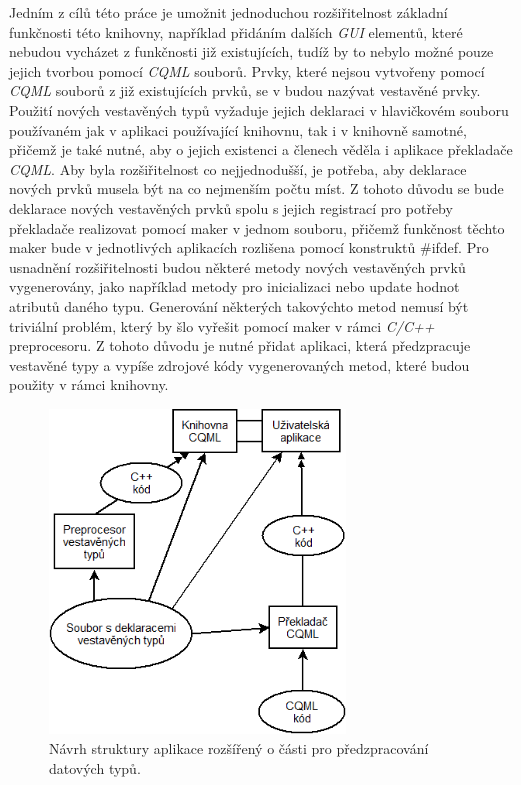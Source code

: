 \documentclass[11pt,twoside,a4paper]{book}
\begin{document}
Jedním z cílů této práce je umožnit jednoduchou rozšiřitelnost základní funkčnosti této knihovny, například přidáním dalších \textit{GUI} elementů, které nebudou vycházet z funkčnosti již existujících, tudíž by to nebylo možné pouze jejich tvorbou pomocí \textit{CQML} souborů. Prvky, které nejsou vytvořeny pomocí \textit{CQML} souborů z již existujících prvků, se v budou nazývat vestavěné prvky.
Použití nových vestavěných typů vyžaduje jejich deklaraci v hlavičkovém souboru používaném jak v aplikaci používající knihovnu, tak i v knihovně samotné, přičemž je také nutné, aby o jejich existenci a členech věděla i aplikace překladače \textit{CQML}. Aby byla rozšiřitelnost co nejjednodušší, je potřeba, aby deklarace nových prvků musela být na co nejmenším počtu míst. Z tohoto důvodu se bude deklarace nových vestavěných prvků spolu s jejich registrací pro potřeby překladače realizovat pomocí maker v jednom souboru, přičemž funkčnost těchto maker bude v jednotlivých aplikacích rozlišena pomocí konstruktů \#ifdef.
Pro usnadnění rozšiřitelnosti budou některé metody nových vestavěných prvků vygenerovány, jako například metody pro inicializaci nebo update hodnot atributů daného typu. Generování některých takovýchto metod nemusí být triviální problém, který by šlo vyřešit pomocí maker v rámci \textit{C/C++} preprocesoru. Z tohoto důvodu je nutné přidat aplikaci, která předzpracuje vestavěné typy a vypíše zdrojové kódy vygenerovaných metod, které budou použity v rámci knihovny.

\begin{figure}[!ht]
\begin{center}
  \includegraphics[width=0.7\textwidth]{Diagram2}
\caption{{\label{fig:structure2}}Návrh struktury aplikace rozšířený o části pro předzpracování datových typů.}
\end{center}
\end{figure}
\end{document}
